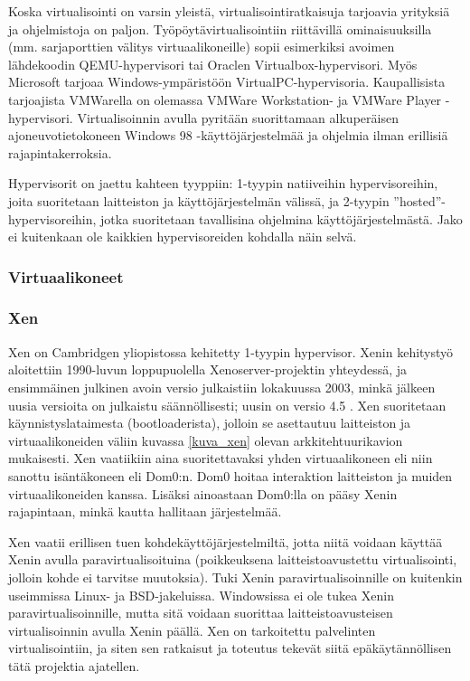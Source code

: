 
Koska virtualisointi on varsin yleistä, virtualisointiratkaisuja tarjoavia yrityksiä ja ohjelmistoja on paljon. Työpöytävirtualisointiin riittävillä ominaisuuksilla (mm. sarjaporttien välitys virtuaalikoneille) sopii esimerkiksi avoimen lähdekoodin QEMU-hypervisori tai Oraclen Virtualbox-hypervisori. Myös Microsoft tarjoaa Windows-ympäristöön VirtualPC-hypervisoria. Kaupallisista tarjoajista VMWarella on olemassa VMWare Workstation- ja VMWare Player -hypervisori. Virtualisoinnin avulla pyritään suorittamaan alkuperäisen ajoneuvotietokoneen Windows 98 -käyttöjärjestelmää ja ohjelmia ilman erillisiä rajapintakerroksia.

Hypervisorit on jaettu kahteen tyyppiin: 1-tyypin natiiveihin hypervisoreihin, joita suoritetaan laitteiston ja käyttöjärjestelmän välissä, ja 2-tyypin ''hosted''-hypervisoreihin, jotka suoritetaan tavallisina ohjelmina käyttöjärjestelmästä. Jako ei kuitenkaan ole kaikkien hypervisoreiden kohdalla näin selvä. %


\subsubsection{Virtuaalikoneet}
\subsubsection{Xen}
Xen on Cambridgen yliopistossa kehitetty 1-tyypin hypervisor. %
Xenin kehitystyö aloitettiin 1990-luvun loppupuolella Xenoserver-projektin yhteydessä, ja ensimmäinen julkinen avoin versio julkaistiin lokakuussa 2003, minkä jälkeen uusia versioita on julkaistu säännöllisesti; uusin on versio 4.5 \cite{xen_history}. Xen suoritetaan käynnistyslataimesta (bootloaderista), jolloin se asettautuu laitteiston ja virtuaalikoneiden väliin kuvassa \ref{kuva_xen} olevan arkkitehtuurikavion mukaisesti. Xen vaatiikiin aina suoritettavaksi yhden virtuaalikoneen eli niin sanottu isäntäkoneen eli Dom0:n. Dom0 hoitaa interaktion laitteiston ja muiden virtuaalikoneiden kanssa. Lisäksi ainoastaan Dom0:lla on pääsy Xenin rajapintaan, minkä kautta hallitaan järjestelmää.

Xen vaatii erillisen tuen kohdekäyttöjärjestelmiltä, jotta niitä voidaan käyttää Xenin avulla paravirtualisoituina (poikkeuksena laitteistoavustettu virtualisointi, jolloin kohde ei tarvitse muutoksia). Tuki Xenin paravirtualisoinnille on kuitenkin useimmissa Linux- ja BSD-jakeluissa. Windowsissa ei ole tukea Xenin paravirtualisoinnille, mutta sitä voidaan suorittaa laitteistoavusteisen virtualisoinnin avulla Xenin päällä. Xen on tarkoitettu palvelinten virtualisointiin, ja siten sen ratkaisut ja toteutus tekevät siitä epäkäytännöllisen tätä projektia ajatellen. \citep{xen_overview}

